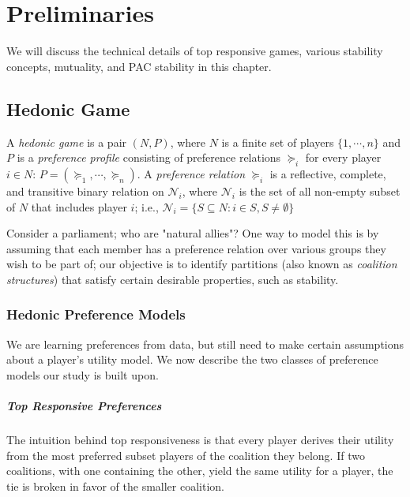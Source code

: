
\chapter{Preliminaries}
\label{ch:preliminaries}
\vspace{2em}

We will discuss the technical details of top responsive games,
various stability concepts, mutuality, and PAC stability in this chapter.

\section{Hedonic Game}
A \textit{hedonic game} is a pair $(N, P)$, where $N$ is a finite set of players
$\{1, \cdots, n\}$ and $P$ is a \textit{preference profile} consisting of
preference relations $\succeq_i$ for every player $i \in N$:
$P = (\succeq_1, \cdots, \succeq_n)$.
A \textit{preference relation} $\succeq_i$ is a reflective, complete, and
transitive binary relation on $\mathcal{N}_i$, where $\mathcal{N}_i$ is the set
of all non-empty subset of $N$ that includes player $i$;
i.e., $\mathcal{N}_i = \{S \subseteq N: i \in S, S \neq \emptyset \}$

Consider a parliament; who are "natural allies"? One way to model this is by
assuming that each member has a preference relation over various groups they
wish to be part of; our objective is to identify partitions
(also known as \textit{coalition structures}) that satisfy certain desirable
properties, such as stability.

\subsection{Hedonic Preference Models}
We are learning preferences from data, but still need to make certain
assumptions about a player's utility model.
We now describe the two classes of preference models our study is built upon.

\paragraph{Top Responsive Preferences}
The intuition behind top responsiveness is that every player derives their
utility from the most preferred subset players of the coalition they belong.
If two coalitions, with one containing the other, yield the same utility for
a player, the tie is broken in favor of the smaller coalition.

